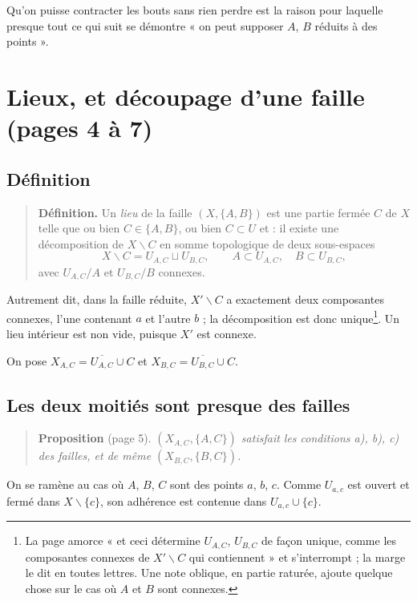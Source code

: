 \documentclass[11pt,a4paper]{article}
\begin{document}
Qu'on puisse contracter les bouts sans rien perdre est la raison pour laquelle
presque tout ce qui suit se démontre « on peut supposer $A$, $B$ réduits à des
points ».

\section*{Lieux, et découpage d'une faille (pages 4 à 7)}

\subsection*{Définition}

\begin{quote}
\textbf{Définition.} Un \emph{lieu} de la faille $(X, \{A,B\})$ est une partie
fermée $C$ de $X$ telle que ou bien $C \in \{A, B\}$, ou bien $C \subset U$ et :
il existe une décomposition de $X \smallsetminus C$ en somme topologique de deux
sous-espaces
\[
X \smallsetminus C = U_{A,C} \sqcup U_{B,C}, \qquad A \subset U_{A,C}, \quad
B \subset U_{B,C},
\]
avec $U_{A,C}/A$ et $U_{B,C}/B$ connexes.
\end{quote}

Autrement dit, dans la faille réduite, $X' \smallsetminus C$ a exactement deux
composantes connexes, l'une contenant $a$ et l'autre $b$ ; la décomposition est
donc unique\footnote{La page amorce « et ceci détermine $U_{A,C}$, $U_{B,C}$ de
façon unique, comme les composantes connexes de $X' \smallsetminus C$ qui
contiennent » et s'interrompt ; la marge le dit en toutes lettres. Une note
oblique, en partie raturée, ajoute quelque chose sur le cas où $A$ et $B$ sont
connexes.}. Un lieu intérieur est non vide, puisque $X'$ est connexe.

On pose $X_{A,C} = \overline{U_{A,C}} \cup C$ et $X_{B,C} = \overline{U_{B,C}}
\cup C$.

\subsection*{Les deux moitiés sont presque des failles}

\begin{quote}
\textbf{Proposition} (page 5). \emph{$(X_{A,C}, \{A,C\})$ satisfait les conditions
a), b), c) des failles, et de même $(X_{B,C}, \{B,C\})$.}
\end{quote}

On se ramène au cas où $A$, $B$, $C$ sont des points $a$, $b$, $c$. Comme
$U_{a,c}$ est ouvert et fermé dans $X \smallsetminus \{c\}$, son adhérence est
contenue dans $U_{a,c} \cup \{c\}$.
\end{document}
